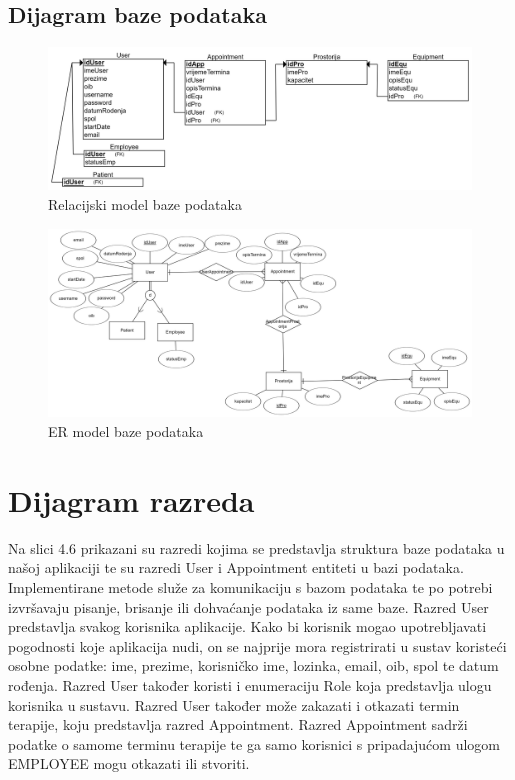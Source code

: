 			\newpage
			
			\subsection{Dijagram baze podataka}
				
				\begin{figure}[H]
					\includegraphics[scale=0.14]{slike/bp_rel.PNG} %
					\centering
					\caption{Relacijski model baze podataka}
					\label{fig:promjene}
				\end{figure}
				
				\begin{figure}[H]
					\includegraphics[scale=0.085]{slike/bp_er.PNG} %
					\centering
					\caption{ER model baze podataka}
					\label{fig:promjene}
				\end{figure}
			
			\eject
			
			
		\section{Dijagram razreda}
		
			Na slici 4.6 prikazani su razredi kojima se predstavlja struktura baze podataka u našoj aplikaciji te su razredi User i Appointment entiteti u bazi podataka. Implementirane metode služe za komunikaciju s bazom podataka te po potrebi izvršavaju pisanje, brisanje ili dohvaćanje podataka iz same baze. Razred User predstavlja svakog korisnika aplikacije. Kako bi korisnik mogao upotrebljavati pogodnosti koje aplikacija nudi, on se najprije mora registrirati u sustav koristeći osobne podatke: ime, prezime, korisničko ime, lozinka, email, oib, spol te datum rođenja. Razred User također koristi i enumeraciju Role koja predstavlja ulogu korisnika u sustavu. Razred User također može zakazati i otkazati termin terapije, koju predstavlja razred Appointment. Razred Appointment sadrži podatke o samome terminu terapije te ga samo korisnici s pripadajućom ulogom EMPLOYEE mogu otkazati ili stvoriti.
		
